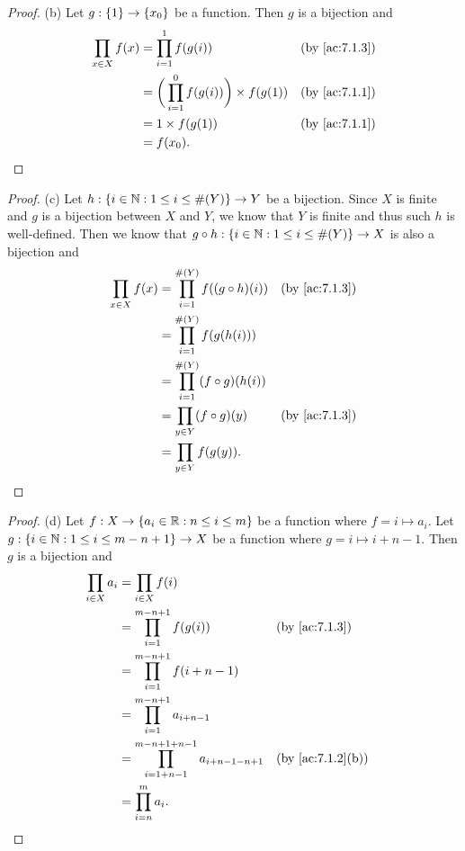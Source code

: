 \begin{proof}{(b)}
  Let \(g : \left\lbrace1\right\rbrace \to \left\lbrace x_0\right\rbrace\) be a function.
  Then \(g\) is a bijection and
  \begin{align*}
    \prod_{x \in X} f(x) & = \prod_{i = 1}^1 f(g(i))                            &  & \by{ac:7.1.3} \\
                         & = \bigg(\prod_{i = 1}^0 f(g(i))\bigg) \times f(g(1)) &  & \by{ac:7.1.1} \\
                         & = 1 \times f(g(1))                                   &  & \by{ac:7.1.1} \\
                         & = f(x_0).
  \end{align*}
\end{proof}

\begin{proof}{(c)}
  Let \(h : \left\lbrace i \in \mathbb{N} : 1 \leq i \leq \#(Y)\right\rbrace \to Y\) be a bijection.
  Since \(X\) is finite and \(g\) is a bijection between \(X\) and \(Y\), we know that \(Y\) is finite and thus such \(h\) is well-defined.
  Then we know that \(g \circ h : \left\lbrace i \in \mathbb{N} : 1 \leq i \leq \#(Y)\right\rbrace \to X\) is also a bijection and
  \begin{align*}
    \prod_{x \in X} f(x) & = \prod_{i = 1}^{\#(Y)} f((g \circ h)(i)) &  & \by{ac:7.1.3} \\
                         & = \prod_{i = 1}^{\#(Y)} f(g(h(i)))                           \\
                         & = \prod_{i = 1}^{\#(Y)} (f \circ g)(h(i))                    \\
                         & = \prod_{y \in Y} (f \circ g)(y)          &  & \by{ac:7.1.3} \\
                         & = \prod_{y \in Y} f(g(y)).
  \end{align*}
\end{proof}

\begin{proof}{(d)}
  Let \(f : X \to \left\lbrace a_i \in \mathbb{R} : n \leq i \leq m\right\rbrace\) be a function where \(f = i \mapsto a_i\).
  Let \(g : \left\lbrace i \in \mathbb{N} : 1 \leq i \leq m - n + 1\right\rbrace \to X\) be a function where \(g = i \mapsto i + n - 1\).
  Then \(g\) is a bijection and
  \begin{align*}
    \prod_{i \in X} a_i & = \prod_{i \in X} f(i)                                                                                \\
                        & = \prod_{i = 1}^{m - n + 1} f(g(i))                               &  & \by{ac:7.1.3}                  \\
                        & = \prod_{i = 1}^{m - n + 1} f(i + n - 1)                                                              \\
                        & = \prod_{i = 1}^{m - n + 1} a_{i + n - 1}                                                             \\
                        & = \prod_{i = 1 + n - 1}^{m - n + 1 + n - 1} a_{i + n - 1 - n + 1} &  & \text{(by \cref{ac:7.1.2}(b))} \\
                        & = \prod_{i = n}^m a_i.
  \end{align*}
\end{proof}

